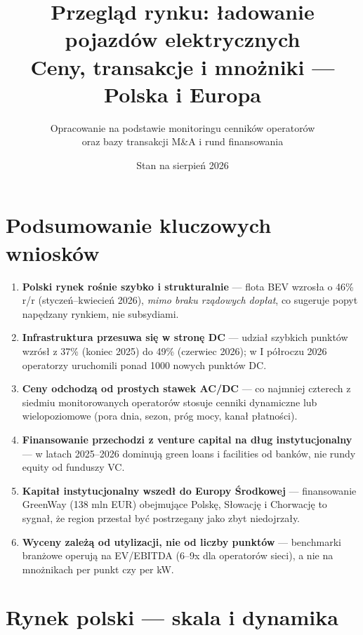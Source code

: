 \documentclass[11pt,a4paper]{article}
\title{\textbf{Przegląd rynku: ładowanie pojazdów elektrycznych}\\
	\large Ceny, transakcje i mnożniki --- Polska i Europa}
\author{Opracowanie na podstawie monitoringu cenników operatorów\\
	oraz bazy transakcji M\&A i rund finansowania}
\date{Stan na sierpień 2026}
\begin{document}
	\maketitle
	\vspace{-0.8cm}
	\noindent\hrulefill
	\vspace{0.6cm}
	
	\section{Podsumowanie kluczowych wniosków}
	
	\begin{infobox}
		\begin{enumerate}[leftmargin=1.3em, itemsep=4pt]
			\item \textbf{Polski rynek rośnie szybko i strukturalnie} --- flota BEV wzrosła
			o 46\% r/r (styczeń--kwiecień 2026), \emph{mimo braku rządowych dopłat}, co
			sugeruje popyt napędzany rynkiem, nie subsydiami.
			\item \textbf{Infrastruktura przesuwa się w stronę DC} --- udział szybkich
			punktów wzrósł z 37\% (koniec 2025) do 49\% (czerwiec 2026); w I półroczu
			2026 operatorzy uruchomili ponad 1000 nowych punktów DC.
			\item \textbf{Ceny odchodzą od prostych stawek AC/DC} --- co najmniej czterech
			z siedmiu monitorowanych operatorów stosuje cenniki dynamiczne lub
			wielopoziomowe (pora dnia, sezon, próg mocy, kanał płatności).
			\item \textbf{Finansowanie przechodzi z venture capital na dług
				instytucjonalny} --- w latach 2025--2026 dominują green loans i facilities
			od banków, nie rundy equity od funduszy VC.
			\item \textbf{Kapitał instytucjonalny wszedł do Europy Środkowej} ---
			finansowanie GreenWay (138 mln EUR) obejmujące Polskę, Słowację i Chorwację
			to sygnał, że region przestał być postrzegany jako zbyt niedojrzały.
			\item \textbf{Wyceny zależą od utylizacji, nie od liczby punktów} ---
			benchmarki branżowe operują na EV/EBITDA (6--9x dla operatorów sieci),
			a nie na mnożnikach per punkt czy per kW.
		\end{enumerate}
	\end{infobox}
	
	\section{Rynek polski --- skala i dynamika}
	
\end{document}
